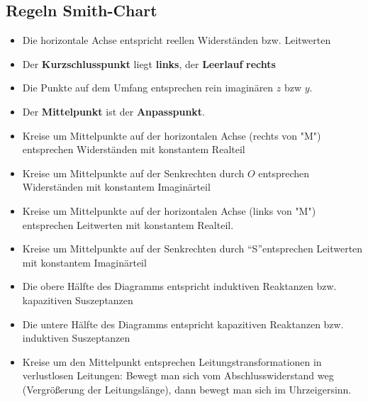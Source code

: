 \documentclass[english]{latex4ei/latex4ei_sheet}
\begin{document}
\begin{sectionbox}
    \subsection{Regeln Smith-Chart}
    \begin{itemize}
        \item Die horizontale Achse entspricht reellen Widerständen bzw. Leitwerten
        \item Der \textbf{Kurzschlusspunkt} liegt \textbf{links}, der \textbf{Leerlauf} \textbf{rechts}
        \item Die Punkte auf dem Umfang entsprechen rein imaginären $z$ bzw $y$.
        \item Der \textbf{Mittelpunkt} ist der \textbf{Anpasspunkt}.
        \item Kreise um Mittelpunkte auf der horizontalen Achse (rechts von "M") entsprechen Widerständen mit konstantem Realteil
        \item Kreise um Mittelpunkte auf der Senkrechten durch $O$ entsprechen Widerständen mit konstantem Imaginärteil
        \item Kreise um Mittelpunkte auf der horizontalen Achse (links von "M") entsprechen Leitwerten mit konstantem Realteil.
        \item Kreise um Mittelpunkte auf der Senkrechten durch \textquotedblleft S\textquotedblright entsprechen Leitwerten mit konstantem Imaginärteil
        \item Die obere Hälfte des Diagramms entspricht induktiven Reaktanzen bzw. kapazitiven Suszeptanzen
        \item Die untere Hälfte des Diagramms entspricht kapazitiven Reaktanzen bzw. induktiven Suszeptanzen
        \item Kreise um den Mittelpunkt entsprechen Leitungstransformationen in verlustlosen Leitungen: Bewegt man sich vom Abschlusswiderstand weg (Vergrößerung der Leitungslänge), dann bewegt man sich im Uhrzeigersinn.
    \end{itemize}
\end{sectionbox}
\end{document}
